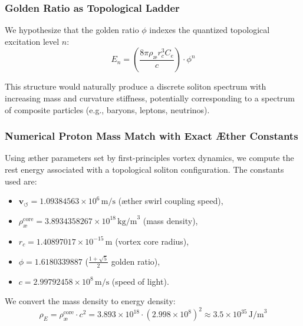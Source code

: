             \subsubsection{Golden Ratio as Topological Ladder}

            We hypothesize that the golden ratio $\phi$ indexes the quantized topological excitation level $n$:
            \begin{equation}
            E_n = \left( \frac{8\pi \rho_{\text{æ}} r_c^3 C_e}{c} \right) \cdot \phi^n
            \end{equation}

            This structure would naturally produce a discrete soliton spectrum with increasing mass and curvature stiffness, potentially corresponding to a spectrum of composite particles (e.g., baryons, leptons, neutrinos).

            \subsubsection{Numerical Proton Mass Match with Exact Æther Constants}

            Using æther parameters set by first-principles vortex dynamics, we compute the rest energy associated with a topological soliton configuration. The constants used are:

            \begin{itemize}
              \item $\mathbf{v}_{\scriptscriptstyle\boldsymbol{\circlearrowleft}} = 1.09384563 \times 10^6 \, \text{m/s}$ (æther swirl coupling speed),
              \item $\rho_{\text{æ}}^{\text{core}} = 3.8934358267 \times 10^{18} \, \text{kg/m}^3$ (mass density),
              \item $r_c = 1.40897017 \times 10^{-15} \, \text{m}$ (vortex core radius),
              \item $\phi = 1.6180339887$  ($\frac{1 + \sqrt{5}}{2}$ golden ratio),
              \item $c = 2.99792458 \times 10^8 \, \text{m/s}$ (speed of light).
            \end{itemize}

            We convert the mass density to energy density:
            \begin{equation}
            \rho_E = \rho_{\text{æ}}^{\text{core}} \cdot c^2 = 3.893 \times 10^{18} \cdot (2.998 \times 10^8)^2 \approx 3.5 \times 10^{35} \, \text{J/m}^3
            \end{equation}

